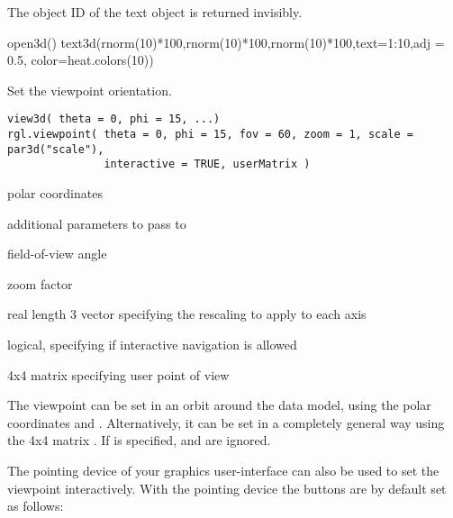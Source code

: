 \documentclass{article}
\begin{document}
\begin{Value}
The object ID of the text object is returned invisibly.
\end{Value}
\begin{SeeAlso}\relax
{}
\end{SeeAlso}
\begin{Examples}
\begin{ExampleCode}
open3d()
text3d(rnorm(10)*100,rnorm(10)*100,rnorm(10)*100,text=1:10,adj = 0.5, 
       color=heat.colors(10))
\end{ExampleCode}
\end{Examples}

\begin{Description}\relax
Set the viewpoint orientation.
\end{Description}
\begin{Usage}
\begin{verbatim}
view3d( theta = 0, phi = 15, ...)
rgl.viewpoint( theta = 0, phi = 15, fov = 60, zoom = 1, scale = par3d("scale"), 
               interactive = TRUE, userMatrix )
\end{verbatim}
\end{Usage}
\begin{Arguments}
\begin{ldescription}
\item[\code{theta,phi}] polar coordinates
\item[\code{...}] additional parameters to pass to 
\item[\code{fov}] field-of-view angle
\item[\code{zoom}] zoom factor
\item[\code{scale}] real length 3 vector specifying the rescaling to apply to each axis
\item[\code{interactive}] logical, specifying if interactive navigation is allowed
\item[\code{userMatrix}] 4x4 matrix specifying user point of view
\end{ldescription}
\end{Arguments}
\begin{Details}\relax
The viewpoint can be set in an orbit around the data model, using the polar coordinates \code{\\theta}
and .  Alternatively, it can be set in a completely general way using the 4x4 matrix
.  If  is specified,  and  are ignored.

The pointing device of your graphics user-interface can also be used to 
set the viewpoint interactively. With the pointing device the buttons are by default set as follows:

\end{Details}
\end{document}
